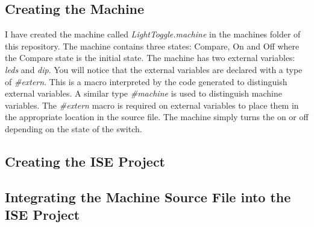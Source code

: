 \documentclass{article}
\begin{document}
            \subsection{Creating the Machine}
                I have created the machine called \textit{LightToggle.machine} in the machines folder of this repository. The machine contains three states: \textsf{Compare}, \textsf{On} and \textsf{Off} where the \textsf{Compare} state is the initial state. The machine has two external variables: \textit{leds} and \textit{dip}. You will notice that the external variables are declared with a type of \textit{\#extern}. This is a macro interpreted by the code generated to distinguish external variables. A similar type \textit{\#machine} is used to distinguish machine variables. The \textit{\#extern} macro is required on external variables to place them in the appropriate location in the \VHDL\/ source file. The machine simply turns the \LEDs\/ on or off depending on the state of the \DIP\/ switch.
            \subsection{Creating the ISE Project}
            \subsection{Integrating the Machine Source File into the ISE Project}
\end{document}
